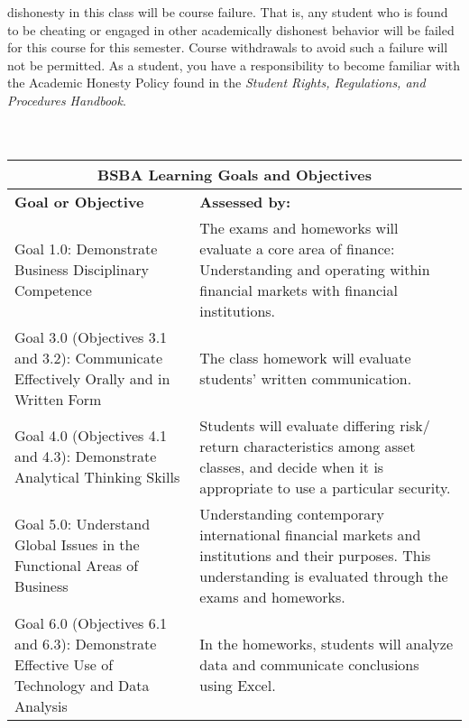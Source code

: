 \documentclass{article}
\begin{document}
dishonesty in this class will be course failure. That is, any student who is found to be cheating
or engaged in other academically dishonest behavior will be failed for this course for this
semester. Course withdrawals to avoid such a failure will not be permitted. As a student, you
have a responsibility to become familiar with the Academic Honesty Policy found in the {\it Student
Rights, Regulations, and Procedures Handbook}.\\
\\
\\
\begin{tabular}{|p{2.1 in}|p{3.1 in}|} \hline
\multicolumn{2}{|c|}{\bf BSBA Learning Goals and Objectives} \\ \hline
{\bf Goal or Objective} & {\bf Assessed by:} \\ \hline
Goal 1.0: Demonstrate Business Disciplinary Competence & The exams and homeworks will evaluate a core area of finance: Understanding and operating within financial markets with financial institutions. \\ \hline
Goal 3.0 (Objectives 3.1 and 3.2): Communicate Effectively Orally and in Written Form & The class homework will evaluate students' written communication. \\ \hline
Goal 4.0 (Objectives 4.1 and 4.3): Demonstrate Analytical Thinking Skills & Students will evaluate differing risk/ return characteristics among asset classes, and decide when it is appropriate to use a particular security. \\ \hline
Goal 5.0: Understand Global Issues in the Functional Areas of Business & Understanding contemporary international financial markets and institutions and their purposes. This understanding is evaluated through the exams and homeworks. \\ \hline
Goal 6.0 (Objectives 6.1 and 6.3): Demonstrate Effective Use of Technology and Data Analysis & In the homeworks, students will analyze data and communicate conclusions using Excel. \\ \hline
\end{tabular}
\end{document}
